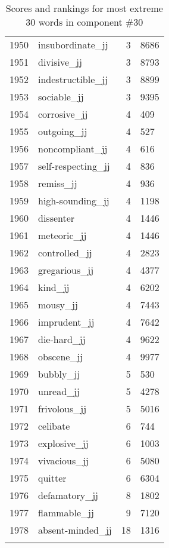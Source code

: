 \begin{longtable}[!htbp]{| rlr@{.}l |}
    1950 & insubordinate\_jj & 3 & 8686 \\
    1951 & divisive\_jj & 3 & 8793 \\
    1952 & indestructible\_jj & 3 & 8899 \\
    1953 & sociable\_jj & 3 & 9395 \\
    1954 & corrosive\_jj & 4 & 409 \\
    1955 & outgoing\_jj & 4 & 527 \\
    1956 & noncompliant\_jj & 4 & 616 \\
    1957 & self-respecting\_jj & 4 & 836 \\
    1958 & remiss\_jj & 4 & 936 \\
    1959 & high-sounding\_jj & 4 & 1198 \\
    1960 & dissenter & 4 & 1446 \\
    1961 & meteoric\_jj & 4 & 1446 \\
    1962 & controlled\_jj & 4 & 2823 \\
    1963 & gregarious\_jj & 4 & 4377 \\
    1964 & kind\_jj & 4 & 6202 \\
    1965 & mousy\_jj & 4 & 7443 \\
    1966 & imprudent\_jj & 4 & 7642 \\
    1967 & die-hard\_jj & 4 & 9622 \\
    1968 & obscene\_jj & 4 & 9977 \\
    1969 & bubbly\_jj & 5 & 530 \\
    1970 & unread\_jj & 5 & 4278 \\
    1971 & frivolous\_jj & 5 & 5016 \\
    1972 & celibate & 6 & 744 \\
    1973 & explosive\_jj & 6 & 1003 \\
    1974 & vivacious\_jj & 6 & 5080 \\
    1975 & quitter & 6 & 6304 \\
    1976 & defamatory\_jj & 8 & 1802 \\
    1977 & flammable\_jj & 9 & 7120 \\
    1978 & absent-minded\_jj & 18 & 1316 \\
    \hline
    \caption{Scores and rankings for most extreme 30 words in component \#30} \\
\end{longtable}
